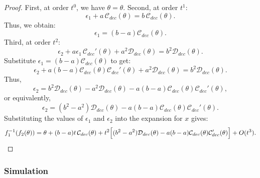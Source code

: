 \documentclass[si.tex]{subfiles}
\begin{document}
\begin{proof}
First, at order \( t^0 \), we have $\theta=\theta$.
Second, at order \( t^1 \):
\[
\epsilon_1 + a\,\mathcal{C}_{dec}(\theta) = b\,\mathcal{C}_{dec}(\theta).
\]
Thus, we obtain:
\[
\epsilon_1 = (b - a)\mathcal{C}_{dec}(\theta).
\]
Third, at order \( t^2 \):
\[
\epsilon_2 + a\epsilon_1\,\mathcal{C}_{dec}'(\theta) + a^2\mathcal{D}_{dec}(\theta) = b^2\mathcal{D}_{dec}(\theta).
\]
Substitute \(\epsilon_1 = (b-a)\mathcal{C}_{dec}(\theta)\) to get:
\[
\epsilon_2 + a(b-a)\mathcal{C}_{dec}(\theta)\mathcal{C}_{dec}'(\theta) + a^2\mathcal{D}_{dec}(\theta) = b^2\mathcal{D}_{dec}(\theta).
\]
Thus,
\[
\epsilon_2 = b^2\mathcal{D}_{dec}(\theta) - a^2\mathcal{D}_{dec}(\theta) - a(b-a)\mathcal{C}_{dec}(\theta)\mathcal{C}_{dec}'(\theta),
\]
or equivalently,
\[
\epsilon_2 = (b^2-a^2)\mathcal{D}_{dec}(\theta) - a(b-a)\mathcal{C}_{dec}(\theta)\mathcal{C}_{dec}'(\theta).
\]
Substituting the values of \(\epsilon_1\) and \(\epsilon_2\) into the expansion for \( x \) gives:
\[
f_1^{-1}(f_2(\theta)) = \theta + (b-a)t\,\mathcal{C}_{dec}(\theta) + t^2\Bigl[(b^2-a^2)\mathcal{D}_{dec}(\theta)-a(b-a)\mathcal{C}_{dec}(\theta)\mathcal{C}_{dec}'(\theta)\Bigr] + O(t^3).
\]
    \end{proof}



\subsubsection{Simulation}\label{sec:2afc-experiment}
\end{document}
